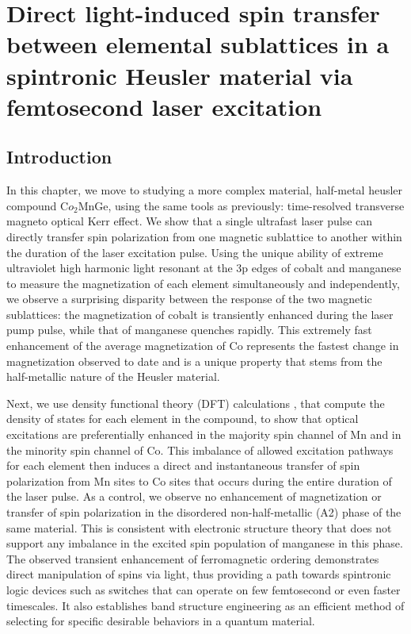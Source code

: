 \chapter{Direct light-induced spin transfer between elemental sublattices in a spintronic Heusler material via femtosecond laser excitation}
\label{heuslerpaper}

\section{Introduction}
In this chapter, we move to studying a more complex material, half-metal heusler compound C$o_2$MnGe, using the same tools as previously: time-resolved transverse magneto optical Kerr effect. We show that a single ultrafast laser pulse can directly transfer spin polarization from one magnetic sublattice to another within the duration of the laser excitation pulse. Using the unique ability of extreme ultraviolet high harmonic light resonant at the 3p edges of cobalt and manganese to measure the magnetization of each element simultaneously and independently, we observe a surprising disparity between the response of the two magnetic sublattices: the magnetization of cobalt is transiently enhanced during the laser pump pulse, while that of manganese quenches rapidly. This extremely fast enhancement of the average magnetization of Co represents the fastest change in magnetization observed to date and is a unique property that stems from the half-metallic nature of the Heusler material. 

Next, we use density functional theory (DFT) calculations \cite{Hohenberg1964,KOHN1965}, that compute the density of states for each element in the compound, to show that optical excitations are preferentially enhanced in the majority spin channel of Mn and in the minority spin channel of Co. This imbalance of allowed excitation pathways for each element then induces a direct and instantaneous transfer of spin polarization from Mn sites to Co sites that occurs during the entire duration of the laser pulse. As a control, we observe no enhancement of magnetization or transfer of spin polarization in the disordered non-half-metallic (A2) phase of the same material. This is consistent with electronic structure theory that does not support any imbalance in the excited spin population of manganese in this phase. The observed transient enhancement of ferromagnetic ordering demonstrates direct manipulation of spins via light, thus providing a path towards spintronic logic devices such as switches that can operate on few femtosecond or even faster timescales. It also establishes band structure engineering as an efficient method of selecting for specific desirable behaviors in a quantum material.

